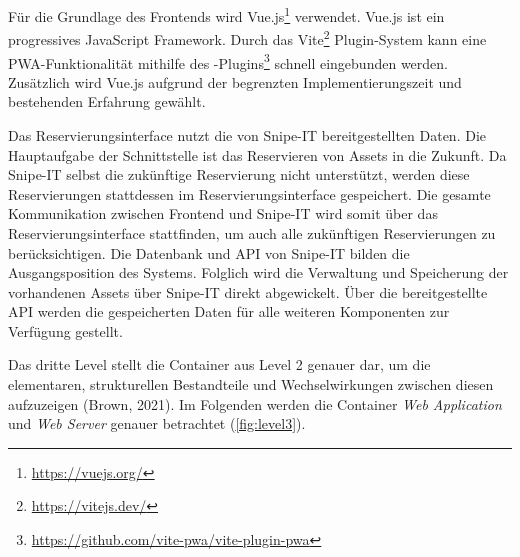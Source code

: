 Für die Grundlage des Frontends wird Vue.js\footnote{\url{https://vuejs.org/}} verwendet. Vue.js ist
ein progressives JavaScript Framework. Durch das Vite\footnote{\url{https://vitejs.dev/}}
Plugin-System kann eine PWA-Funktionalität mithilfe des
-Plugins\footnote{\url{https://github.com/vite-pwa/vite-plugin-pwa}}
schnell eingebunden werden. Zusätzlich wird Vue.js aufgrund der begrenzten Implementierungszeit und
bestehenden Erfahrung gewählt.

Das Reservierungsinterface nutzt die von Snipe-IT bereitgestellten Daten. Die
Hauptaufgabe der Schnittstelle ist das Reservieren von Assets in die Zukunft. Da
Snipe-IT selbst die zukünftige Reservierung nicht unterstützt, werden diese
Reservierungen stattdessen im Reservierungsinterface gespeichert. Die gesamte
Kommunikation zwischen Frontend und Snipe-IT wird somit über das
Reservierungsinterface stattfinden, um auch alle zukünftigen Reservierungen zu
berücksichtigen. Die Datenbank und API von Snipe-IT bilden die Ausgangsposition
des Systems. Folglich wird die Verwaltung und Speicherung der vorhandenen Assets
über Snipe-IT direkt abgewickelt. Über die bereitgestellte API werden die
gespeicherten Daten für alle weiteren Komponenten zur Verfügung gestellt.

    {\sffamily\color{maincolor}{Level 3: Components}}

Das dritte Level stellt die Container aus Level 2 genauer dar, um die
elementaren, strukturellen Bestandteile und Wechselwirkungen zwischen diesen
aufzuzeigen (Brown, 2021). Im Folgenden werden die Container
\textit{Web Application} und \textit{Web Server} genauer betrachtet
(\ref{fig:level3}).

